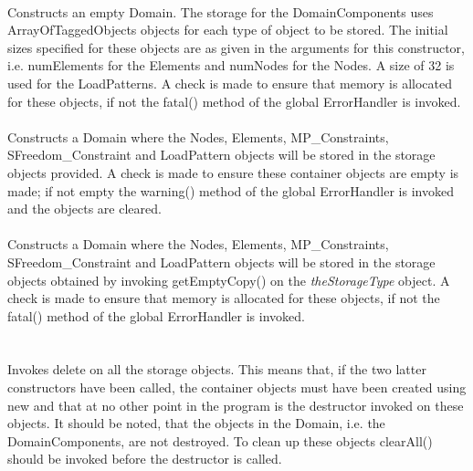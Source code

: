   \\ 
Constructs an empty Domain. The storage for the DomainComponents uses
ArrayOfTaggedObjects objects for each type of object to be stored. The
initial sizes specified for these objects are as given in the
arguments for this constructor, i.e. \p numElements for the
Elements and \p numNodes for the Nodes. A size of 32 is used for
the LoadPatterns. A check is made to ensure that memory
is allocated for these objects, if not the fatal() method of the
global ErrorHandler is invoked.\\   


 \\
Constructs a Domain where the Nodes, Elements, MP\_Constraints,
SFreedom\_Constraint and LoadPattern objects will be
stored in the storage objects provided. A check is made to ensure
these container objects are empty is made; if not empty the warning()
method of the global ErrorHandler is invoked and the objects are
cleared. \\

 \\
Constructs a Domain where the Nodes, Elements, MP\_Constraints,
SFreedom\_Constraint and LoadPattern objects will be stored in the storage
objects obtained by invoking getEmptyCopy() on the {\em
theStorageType} object. A check is made to ensure that memory is
allocated for these objects, if not the fatal() method of the
global ErrorHandler is invoked.\\    

  \\
  \\
Invokes delete on all the storage objects. This means that, if the two
latter constructors have been called, the container objects must have 
been created using \p new and that at no other point in the program
is the destructor invoked on these objects. It should be noted, that
the objects in the Domain, i.e. the DomainComponents, are not
destroyed. To clean up these objects clearAll() should be
invoked before the destructor is called. \\

